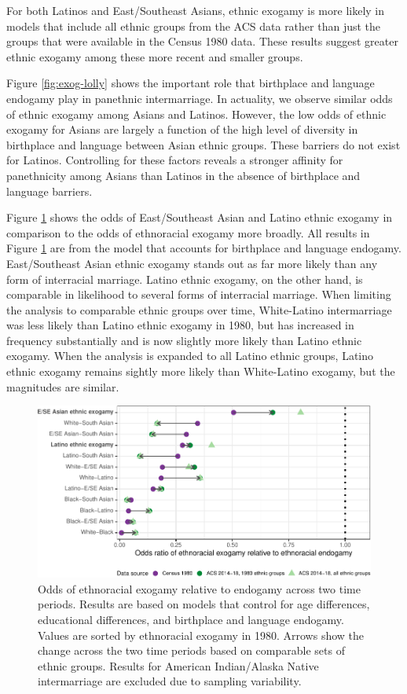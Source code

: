 \documentclass[11pt,]{article}
\begin{document}
For both Latinos and East/Southeast Asians, ethnic exogamy is more likely in models that include all ethnic groups from the ACS data rather than just the groups that were available in the Census 1980 data. These results suggest greater ethnic exogamy among these more recent and smaller groups.

Figure \ref{fig:exog-lolly} shows the important role that birthplace and language endogamy play in panethnic intermarriage. In actuality, we observe similar odds of ethnic exogamy among Asians and Latinos. However, the low odds of ethnic exogamy for Asians are largely a function of the high level of diversity in birthplace and language between Asian ethnic groups. These barriers do not exist for Latinos. Controlling for these factors reveals a stronger affinity for panethnicity among Asians than Latinos in the absence of birthplace and language barriers.

Figure \ref{fig:changes-intermar} shows the odds of East/Southeast Asian and Latino ethnic exogamy in comparison to the odds of ethnoracial exogamy more broadly. All results in Figure \ref{fig:changes-intermar} are from the model that accounts for birthplace and language endogamy. East/Southeast Asian ethnic exogamy stands out as far more likely than any form of interracial marriage. Latino ethnic exogamy, on the other hand, is comparable in likelihood to several forms of interracial marriage. When limiting the analysis to comparable ethnic groups over time, White-Latino intermarriage was less likely than Latino ethnic exogamy in 1980, but has increased in frequency substantially and is now slightly more likely than Latino ethnic exogamy. When the analysis is expanded to all Latino ethnic groups, Latino ethnic exogamy remains sightly more likely than White-Latino exogamy, but the magnitudes are similar.

\begin{figure}
\centering
\includegraphics{main_files/figure-latex/changes-intermar-1.pdf}
\caption{\label{fig:changes-intermar}Odds of ethnoracial exogamy relative to endogamy across two time periods. Results are based on models that control for age differences, educational differences, and birthplace and language endogamy. Values are sorted by ethnoracial exogamy in 1980. Arrows show the change across the two time periods based on comparable sets of ethnic groups. Results for American Indian/Alaska Native intermarriage are excluded due to sampling variability.}
\end{figure}
\end{document}
